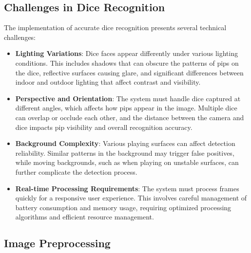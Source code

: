 \subsection{Challenges in Dice Recognition}

The implementation of accurate dice recognition presents several technical challenges:
\begin{itemize}
    \item \textbf{Lighting Variations}: Dice faces appear differently under various lighting conditions. This includes shadows that can obscure the patterns of pips on the dice, reflective surfaces causing glare, and significant differences between indoor and outdoor lighting that affect contrast and visibility.
    \item \textbf{Perspective and Orientation}: The system must handle dice captured at different angles, which affects how pips appear in the image. Multiple dice can overlap or occlude each other, and the distance between the camera and dice impacts pip visibility and overall recognition accuracy.
    \item \textbf{Background Complexity}: Various playing surfaces can affect detection reliability. Similar patterns in the background may trigger false positives, while moving backgrounds, such as when playing on unstable surfaces, can further complicate the detection process.
    \item \textbf{Real-time Processing Requirements}: The system must process frames quickly for a responsive user experience. This involves careful management of battery consumption and memory usage, requiring optimized processing algorithms and efficient resource management.
\end{itemize}

\subsection{Image Preprocessing}

